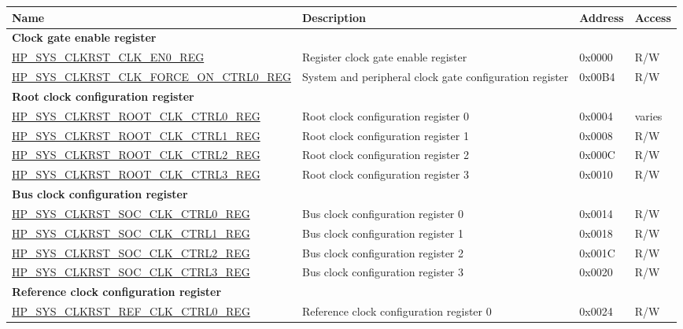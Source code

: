 \begin{longtable}{ | p{7.5cm} | p{6.2cm} | p{1.3cm} | p{1cm} | }
\hline\rowcolor{lightgray}
Name & Description &  Address & Access \\ \hline
\endhead
\multicolumn{4}{|l|}{\textbf{Clock gate enable register}} \\ \hline
\hyperref[regdesc:HPSYSCLKRSTCLKEN0REG]{HP\_SYS\_CLKRST\_CLK\_EN0\_REG} & Register clock gate enable register & 0x0000 & R/W \\ \hline
\hyperref[regdesc:HPSYSCLKRSTCLKFORCEONCTRL0REG]{HP\_SYS\_CLKRST\_CLK\_FORCE\_ON\_CTRL0\_REG} & System and peripheral clock gate configuration register  & 0x00B4 & R/W \\ \hline
\multicolumn{4}{|l|}{\textbf{Root clock configuration register}} \\ \hline
\hyperref[regdesc:HPSYSCLKRSTROOTCLKCTRL0REG]{HP\_SYS\_CLKRST\_ROOT\_CLK\_CTRL0\_REG} & Root clock configuration register 0 & 0x0004 & varies \\ \hline
\hyperref[regdesc:HPSYSCLKRSTROOTCLKCTRL1REG]{HP\_SYS\_CLKRST\_ROOT\_CLK\_CTRL1\_REG} & Root clock configuration register 1 & 0x0008 & R/W \\ \hline
\hyperref[regdesc:HPSYSCLKRSTROOTCLKCTRL2REG]{HP\_SYS\_CLKRST\_ROOT\_CLK\_CTRL2\_REG} & Root clock configuration register 2 & 0x000C & R/W \\ \hline
\hyperref[regdesc:HPSYSCLKRSTROOTCLKCTRL3REG]{HP\_SYS\_CLKRST\_ROOT\_CLK\_CTRL3\_REG} & Root clock configuration register 3 & 0x0010 & R/W \\ \hline
\multicolumn{4}{|l|}{\textbf{Bus clock configuration register}} \\ \hline
\hyperref[regdesc:HPSYSCLKRSTSOCCLKCTRL0REG]{HP\_SYS\_CLKRST\_SOC\_CLK\_CTRL0\_REG} & Bus clock configuration register 0 & 0x0014 & R/W \\ \hline
\hyperref[regdesc:HPSYSCLKRSTSOCCLKCTRL1REG]{HP\_SYS\_CLKRST\_SOC\_CLK\_CTRL1\_REG} & Bus clock configuration register 1 & 0x0018 & R/W \\ \hline
\hyperref[regdesc:HPSYSCLKRSTSOCCLKCTRL2REG]{HP\_SYS\_CLKRST\_SOC\_CLK\_CTRL2\_REG} & Bus clock configuration register 2 & 0x001C & R/W \\ \hline
\hyperref[regdesc:HPSYSCLKRSTSOCCLKCTRL3REG]{HP\_SYS\_CLKRST\_SOC\_CLK\_CTRL3\_REG} & Bus clock configuration register 3 & 0x0020 & R/W \\ \hline
\multicolumn{4}{|l|}{\textbf{Reference clock configuration register}} \\ \hline
\hyperref[regdesc:HPSYSCLKRSTREFCLKCTRL0REG]{HP\_SYS\_CLKRST\_REF\_CLK\_CTRL0\_REG} & Reference clock configuration register 0 & 0x0024 & R/W \\ \hline

\end{longtable}
